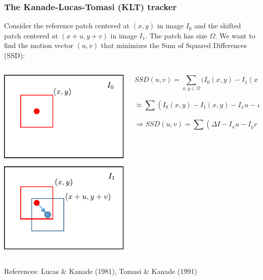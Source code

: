 \begin{frame}
  \frametitle{The Kanade-Lucas-Tomasi (KLT) tracker}
  Consider the reference patch centered at $(x,y)$ in image $I_0$ and the shifted patch centered at $(x+u, y+v)$ in image $I_1$.  
  The patch has size $\Omega$. We want to find the motion vector $(u,v)$ that minimizes the Sum of Squared Differences (SSD):
  
  \begin{columns}
    \begin{column}{0.2\textwidth}
      \begin{center}
        \includegraphics[width=\columnwidth]{./images/optical_flow/klt_tracking.pdf}
      \end{center}
    \end{column}
    \begin{column}{0.7\textwidth}  %
      \[
      SSD(u,v) = \sum_{x,y \in \Omega} \big(I_0(x,y) - I_1(x+u, y+v)\big)^2
      \]

      \[
      \approx \sum ( I_0(x,y) - I_1(x,y) - I_x u - I_y v )^2
      \]

      \[
      \Rightarrow SSD(u,v) = \sum ( \Delta I - I_x u - I_y v )^2
      \]
    \end{column}
  \end{columns}
  References:  
  Lucas \& Kanade (1981), Tomasi \& Kanade (1991)
\end{frame}

